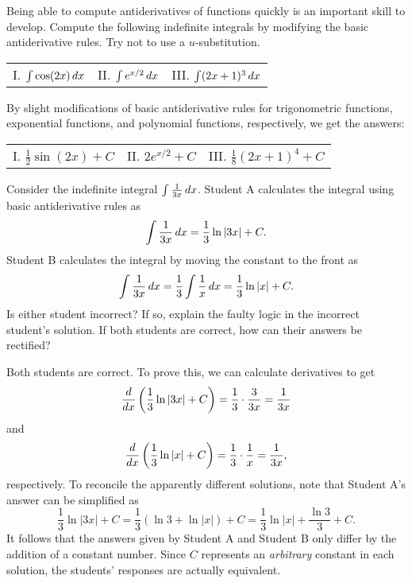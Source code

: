 \documentclass[]{ximera}
\begin{document}
\begin{problem}
Being able to compute antiderivatives of functions quickly is an important skill to develop.  Compute the following indefinite integrals by modifying the basic antiderivative rules.  Try not to use a $u$-substitution.

\begin{center}
\begin{tabular}{lll} 
I. $\int \cos(2x) \mathop{}\!d x$ \hspace{.7in} & II. $\int e^{x/2} \mathop{}\!d x$ \hspace{.7in} & III. $\int (2x+1)^3 \mathop{}\!d x$
\end{tabular}
\end{center}

\end{problem}

\begin{freeResponse} By slight modifications of basic antiderivative rules for trigonometric functions, exponential functions, and polynomial functions, respectively, we get the answers:

\begin{tabular}{lll} 
I. $\frac{1}{2} \sin(2x) + C$ \hspace{.7in} & II. $2 e^{x/2} + C$ \hspace{.7in} & III. $\frac{1}{8} (2x+1)^4 + C$
\end{tabular}
\end{freeResponse}

\begin{problem}
Consider the indefinite integral $\int \frac{1}{3x} \mathop{}\!d x$. Student A calculates the integral using basic antiderivative rules as
$$
\int \frac{1}{3x} \mathop{}\!d x = \frac{1}{3} \ln |3x| + C.
$$
Student B calculates the integral by moving the constant to the front as 
$$
\int \frac{1}{3x} \mathop{}\!d x = \frac{1}{3} \int \frac{1}{x} \mathop{}\!d x = \frac{1}{3} \ln |x| + C.
$$
Is either student incorrect?  If so, explain the faulty logic in the incorrect student's solution.  If both students are correct, how can their answers be rectified?

\end{problem}

\begin{freeResponse} Both students are correct. To prove this, we can calculate derivatives to get
$$
\frac{\mathop{}\!d}{\mathop{}\!d x} \left(\frac{1}{3} \ln |3x| + C\right) = \frac{1}{3} \cdot  \frac{3}{3x} = \frac{1}{3x}
$$
and 
$$
\frac{\mathop{}\!d}{\mathop{}\!d x} \left(\frac{1}{3} \ln |x| + C\right) = \frac{1}{3} \cdot \frac{1}{x} = \frac{1}{3x},
$$
respectively. To reconcile the apparently different solutions, note that Student A's answer can be simplified as
$$
\frac{1}{3} \ln |3x| + C = \frac{1}{3} \left(\ln 3 + \ln |x|\right) + C = \frac{1}{3} \ln |x| + \frac{\ln 3}{3} + C.
$$
It follows that the answers given by Student A and Student B only differ by the addition of a constant number. Since $C$ represents an \textit{arbitrary} constant in each solution, the students' responses are actually equivalent.
\end{freeResponse}
\end{document}
